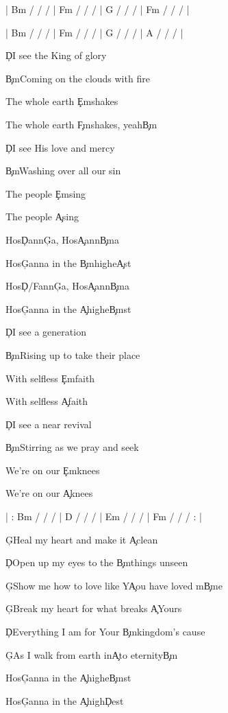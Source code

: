 \documentclass[9pt]{extarticle}
\begin{document}
\bsong

\bi
|  Bm / / /  |  F\s m / / /  |  G / / /  |  F\s m / / /  |

|  Bm / / /  |  F\s m / / /  |  G / / /  |  A / / /  |
\ei

\bv
\c{D}I see the King of glory

\c{Bm}Coming on the clouds with fire

The whole earth \c{Em}shakes

The whole earth \c{F\s m}shakes, yeah\c{Bm}
\ev

\bv
\c{D}I see His love and mercy

\c{Bm}Washing over all our sin

The people \c{Em}sing

The people \c{A}sing
\ev

\bc
Hos\c{D}ann\c{G}a, Hos\c{A}ann\c{Bm}a

Hos\c{G}anna in the \c{Bm}highe\c{A}st

Hos\c{D/F\s }ann\c{G}a, Hos\c{A}ann\c{Bm}a

Hos\c{G}anna in the \c{A}highe\c{Bm}st
\ec

\bv
\c{D}I see a generation

\c{Bm}Rising up to take their place

With selfless \c{Em}faith

With selfless \c{A}faith
\ev

\bv
\c{D}I see a near revival

\c{Bm}Stirring as we pray and seek

We're on our \c{Em}knees

We're on our \c{A}knees
\ev


\bin
| : Bm / / /  |  D / / /  |  Em / / /  |  F\s m / / / : |
\ein

\bb
\c{G}Heal my heart and make it \c{A}clean

\c{D}Open up my eyes to the \c{Bm}things unseen

\c{G}Show me how to love like Y\c{A}ou have loved m\c{Bm}e

\c{G}Break my heart for what breaks \c{A}Yours

\c{D}Everything I am for Your \c{Bm}kingdom's cause

\c{G}As I walk from earth in\c{A}to eternity\c{Bm}
\eb


\bo
Hos\c{G}anna in the \c{A}highe\c{Bm}st

Hos\c{G}anna in the \c{A}high\c{D}est
\eo

\esong
\end{document}
